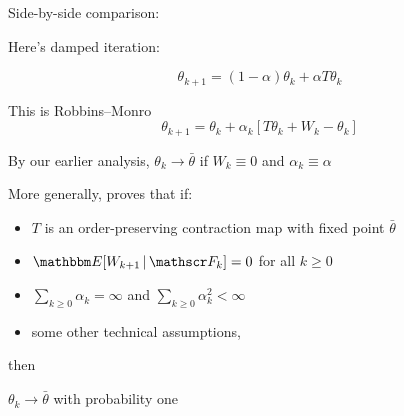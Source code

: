 \documentclass[xcolor=dvipsnames]{beamer}  %
\renewcommand{\geq}{\geqslant}
\newcommand{\1}{\mathbbm 1}
\newcommand{\given}{\, | \,}
\newcommand{\EE}{\mathbbm E}
\newcommand{\fF}{\mathscr F}
\begin{document}
\begin{frame}
    
    Side-by-side comparison:

    \vspace{1em}

    Here's damped iteration:

    \begin{equation*}
        \theta_{k+1} = (1-\alpha) \theta_k + \alpha T \theta_k
    \end{equation*}

    \vspace{1em}
    \vspace{1em}

    This is Robbins--Monro 
    \begin{equation*}
        \theta_{k+1} 
        = \theta_k + \alpha_k [ T \theta_k + W_k - \theta_k ]
    \end{equation*}

\end{frame}


\begin{frame}
    
    By our earlier analysis, $\theta_k \to \bar \theta$ if $W_k \equiv 0$ and
    $\alpha_k \equiv \alpha$

    \vspace{0.5em}
    More generally, \cite{tsitsiklis1994asynchronous} proves that if:
    \begin{itemize}
        \item $T$ is an order-preserving contraction map with fixed
            point $\bar \theta$
            \vspace{0.5em}
        \item $\EE [W_{k+1} \given \fF_k] = 0$ for all $k \geq 0$
            \vspace{0.5em}
        \item $\sum_{k \geq 0} \alpha_k = \infty$ and $\sum_{k \geq 0} \alpha_k^2 < \infty$
            \vspace{0.5em}
        \item some other technical assumptions,
    \end{itemize}
    then 
    \begin{center}
        $\theta_k \to \bar \theta$ with probability one
    \end{center}

\end{frame}
\end{document}
